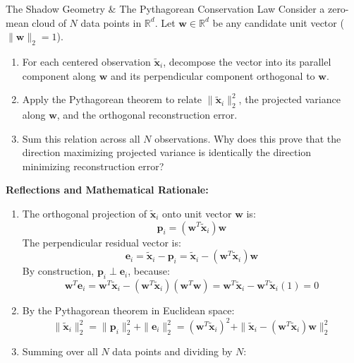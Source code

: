 \begin{ponderbox}{The Shadow Geometry \& The Pythagorean Conservation Law}
Consider a zero-mean cloud of $N$ data points in $\mathbb{R}^d$. Let $\mathbf{w} \in \mathbb{R}^d$ be any candidate unit vector ($\|\mathbf{w}\|_2 = 1$).
\begin{enumerate}
    \item For each centered observation $\tilde{\mathbf{x}}_i$, decompose the vector into its parallel component along $\mathbf{w}$ and its perpendicular component orthogonal to $\mathbf{w}$.
    \item Apply the Pythagorean theorem to relate $\|\tilde{\mathbf{x}}_i\|_2^2$, the projected variance along $\mathbf{w}$, and the orthogonal reconstruction error.
    \item Sum this relation across all $N$ observations. Why does this prove that the direction maximizing projected variance is identically the direction minimizing reconstruction error?
\end{enumerate}
\tcblower
\textbf{Reflections and Mathematical Rationale:}
\begin{enumerate}
    \item The orthogonal projection of $\tilde{\mathbf{x}}_i$ onto unit vector $\mathbf{w}$ is:
    \begin{equation*}
    \mathbf{p}_i = (\mathbf{w}^T \tilde{\mathbf{x}}_i)\mathbf{w}
    \end{equation*}
    The perpendicular residual vector is:
    \begin{equation*}
    \mathbf{e}_i = \tilde{\mathbf{x}}_i - \mathbf{p}_i = \tilde{\mathbf{x}}_i - (\mathbf{w}^T \tilde{\mathbf{x}}_i)\mathbf{w}
    \end{equation*}
    By construction, $\mathbf{p}_i \perp \mathbf{e}_i$, because:
    \begin{equation*}
    \mathbf{w}^T \mathbf{e}_i = \mathbf{w}^T \tilde{\mathbf{x}}_i - (\mathbf{w}^T \tilde{\mathbf{x}}_i)(\mathbf{w}^T \mathbf{w}) = \mathbf{w}^T \tilde{\mathbf{x}}_i - \mathbf{w}^T \tilde{\mathbf{x}}_i(1) = 0
    \end{equation*}
    \item By the Pythagorean theorem in Euclidean space:
    \begin{equation*}
    \|\tilde{\mathbf{x}}_i\|_2^2 = \|\mathbf{p}_i\|_2^2 + \|\mathbf{e}_i\|_2^2 = (\mathbf{w}^T \tilde{\mathbf{x}}_i)^2 + \|\tilde{\mathbf{x}}_i - (\mathbf{w}^T \tilde{\mathbf{x}}_i)\mathbf{w}\|_2^2
    \end{equation*}
    \item Summing over all $N$ data points and dividing by $N$:

\end{enumerate}
\end{ponderbox}
